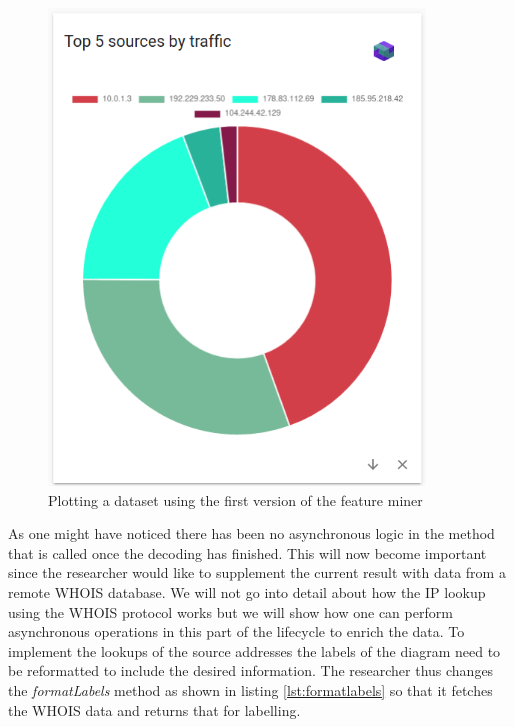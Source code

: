 \begin{figure}[]
    \centering
    \includegraphics[width=10cm]{images/researcher-case-study-first-result.png}
    \caption{Plotting a dataset using the first version of the feature miner}
    \label{fig:firstimplementation}
\end{figure}

As one might have noticed there has been no asynchronous logic in the method that is called once the decoding has finished. This will now become important since the researcher would like to supplement the current result with data from a remote WHOIS database. We will not go into detail about how the IP lookup using the WHOIS protocol works but we will show how one can perform asynchronous operations in this part of the lifecycle to enrich the data.
To implement the lookups of the source addresses the labels of the diagram need to be reformatted to include the desired information. The researcher thus changes the \textit{formatLabels} method as shown in listing \ref{lst:formatlabels} so that it fetches the WHOIS data and returns that for labelling.

